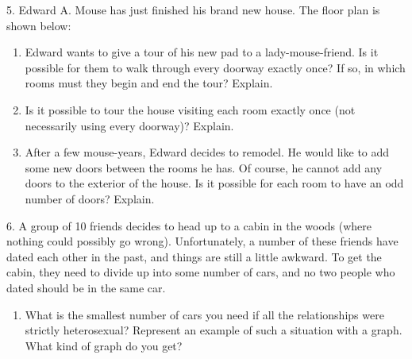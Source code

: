 \documentclass[10pt,]{book}
\theoremstyle{plain}
\theoremstyle{definition}
\theoremstyle{definition}
\theoremstyle{definition}
\numberwithin{equation}{chapter}
\begin{document}
\begin{exerciselist}
\begin{enumerate}[label=(\alph*)]
\end{enumerate}
\par\smallskip
\item[5.]\hypertarget{exercise-317}{}
            Edward A. Mouse has just finished his brand new house. The floor plan is shown below:
\leavevmode%
\begin{figure}
\centering
{
}
\end{figure}
\leavevmode%
\begin{enumerate}[label=(\alph*)]
\item\hypertarget{li-1306}{}
                Edward wants to give a tour of his new pad to a lady-mouse-friend. Is it possible for them to walk through every doorway exactly once? If so, in which rooms must they begin and end the tour? Explain.


\item\hypertarget{li-1307}{}
                Is it possible to tour the house visiting each room exactly once (not necessarily using every doorway)? Explain.



\item\hypertarget{li-1308}{}
                After a few mouse-years, Edward decides to remodel. He would like to add some new doors between the rooms he has. Of course, he cannot add any doors to the exterior of the house. Is it possible for each room to have an odd number of doors? Explain.


\end{enumerate}
\par\smallskip
\item[6.]\hypertarget{exercise-318}{}
            A group of 10 friends decides to head up to a cabin in the woods (where nothing could possibly go wrong). Unfortunately, a number of these friends have dated each other in the past, and things are still a little awkward. To get the cabin, they need to divide up into some number of cars, and no two people who dated should be in the same car.
\leavevmode%
\begin{enumerate}[label=(\alph*)]
\item\hypertarget{li-1309}{}
                What is the smallest number of cars you need if all the relationships were strictly heterosexual? Represent an example of such a situation with a graph. What kind of graph do you get?



\end{enumerate}
\end{exerciselist}
\end{document}
